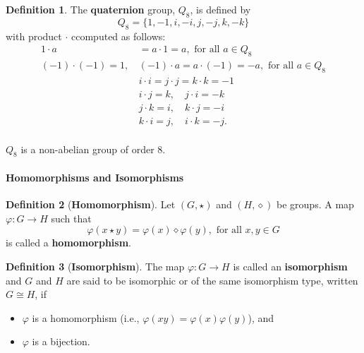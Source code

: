 \documentclass[paper=a4, fontsize=11pt]{scrartcl}
\numberwithin{equation}{section}		%
\numberwithin{figure}{section}			%
\numberwithin{table}{section}				%
\renewcommand{\to}{\ensuremath{\rightarrow}}
\theoremstyle{definition}
\newtheorem{definition}{Definition}[section]
\theoremstyle{remark}
\theoremstyle{example}
\begin{document}
\begin{definition}
    The \textbf{quaternion} group, $Q_8$, is defined by
    \begin{equation}
        Q_8 = \{1,-1,i,-i,j,-j,k,-k\}
    \end{equation}
    with product $\cdot$ ccomputed as follows:
    \begin{equation}
        \begin{aligned}
            1 \cdot a &= a \cdot 1 = a, \text{ for all } a \in Q_8\\
            (-1)\cdot (-1) = 1,\,& (-1)\cdot a = a \cdot (-1) = -a, \text{ for all } a \in Q_8\\
            & i \cdot i = j \cdot j = k \cdot k =-1\\
            & i \cdot j = k, \quad j \cdot i = -k\\
            & j \cdot k = i, \quad k \cdot j = -i\\
            & k \cdot i = j, \quad i \cdot k = -j.
        \end{aligned}  
    \end{equation}
\end{definition}

\paragraph{}

$Q_8$ is a non-abelian group of order $8$.

\paragraph{Homomorphisms and Isomorphisms}

\begin{definition}[\textbf{Homomorphism}]
    Let $(G,\star)$ and $(H,\diamond)$ be groups. A map $\varphi: G \to H$ such that
    \begin{equation}
        \varphi(x \star y) = \varphi(x) \diamond \varphi(y), \text{ for all } x,y \in G
    \end{equation}
    is called a \textbf{homomorphism}.
\end{definition}

\begin{definition}[\textbf{Isomorphism}]
    The map $\varphi: G \to H$ is called an \textbf{isomorphism} and $G$ and $H$ are said to be isomorphic or of the same isomorphism type, written $G \cong H$, if
    \begin{itemize}
        \item $\varphi$ is a homomorphism (i.e., $\varphi(xy) = \varphi(x)\varphi(y)$), and
        \item $\varphi$ is a bijection.
    \end{itemize}
\end{definition}
\end{document}

